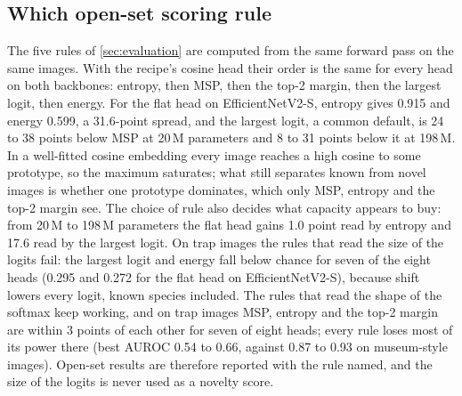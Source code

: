 \subsection{Which open-set scoring rule}\label{sec:results_rules}
The five rules of \cref{sec:evaluation} are computed from the same forward pass on the same images.
With the recipe's cosine head their order is the same for every head on both backbones: entropy, then MSP, then the top-2 margin, then the largest logit, then energy.
For the flat head on EfficientNetV2-S, entropy gives 0.915 and energy 0.599, a 31.6-point spread, and the largest logit, a common default, is 24 to 38 points below MSP at 20\,M parameters and 8 to 31 points below it at 198\,M.
In a well-fitted cosine embedding every image reaches a high cosine to some prototype, so the maximum saturates; what still separates known from novel images is whether one prototype dominates, which only MSP, entropy and the top-2 margin see.
The choice of rule also decides what capacity appears to buy: from 20\,M to 198\,M parameters the flat head gains 1.0 point read by entropy and 17.6 read by the largest logit.
On trap images the rules that read the size of the logits fail: the largest logit and energy fall below chance for seven of the eight heads (0.295 and 0.272 for the flat head on EfficientNetV2-S), because shift lowers every logit, known species included.
The rules that read the shape of the softmax keep working, and on trap images MSP, entropy and the top-2 margin are within 3 points of each other for seven of eight heads; every rule loses most of its power there (best AUROC 0.54 to 0.66, against 0.87 to 0.93 on museum-style images).
Open-set results are therefore reported with the rule named, and the size of the logits is never used as a novelty score.
